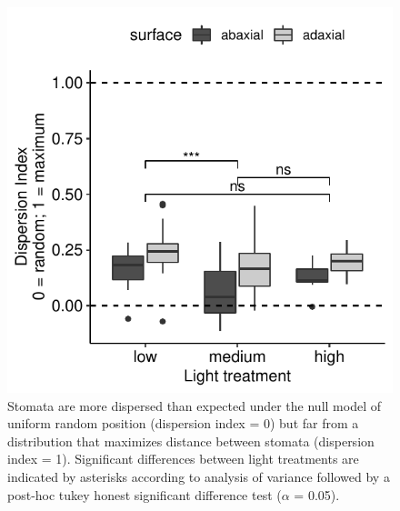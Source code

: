 \documentclass[12pt,halfline,a4paper,]{ouparticle}
\begin{document}
\begin{figure}[ht]
\includegraphics[width=\textwidth]{figures/single-surface.pdf}
\caption{Stomata are more dispersed than expected under the null model of uniform random position (dispersion index = 0) but far from a distribution that maximizes distance between stomata (dispersion index = 1). Significant differences between light treatments are indicated by asterisks according to analysis of variance followed by a post-hoc tukey honest significant difference test ($\alpha$ = 0.05).}
\label{fig:single-surface}
\end{figure}
\end{document}

